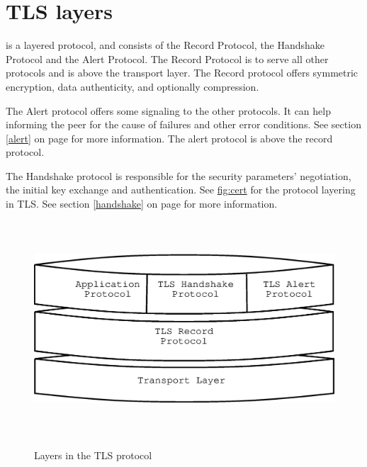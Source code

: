 \section{TLS layers}

\tlsI{} is a layered protocol, and consists of the Record Protocol,
the Handshake Protocol and the Alert Protocol. The Record Protocol
is to serve all other protocols and is above the transport layer.
The Record protocol offers symmetric encryption, data authenticity, and
optionally compression.

\par
The Alert protocol offers some signaling to the other protocols. It can
help informing the peer for the cause of failures and other error
conditions. See section \ref{alert} on page \pageref{alert} for more information.
The alert protocol is above the record protocol.

\par 
The Handshake protocol is responsible for the security parameters'
negotiation, the initial key exchange and
authentication. See \hyperref{figure}{figure }{}{fig:cert} for the
protocol layering in TLS. 
See section \ref{handshake} on page \pageref{handshake} for more information.

\begin{figure}[hbtp]
\includegraphics[height=8cm,width=12cm]{layers}
\label{fig:layers}
\caption{Layers in the TLS protocol}
\end{figure}


\addvspace{1.5cm}

